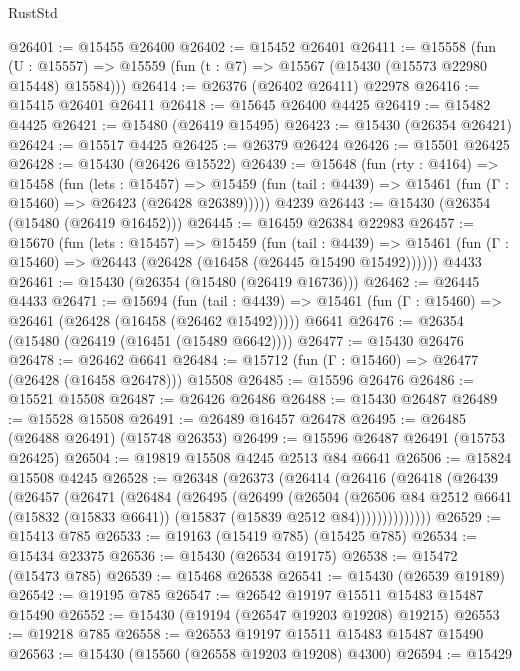 \begin{lexlean}{RustStd}
\begin{coremodule}
{\begin{coremodule}
{{{{{{{{{{{{{{{{{{{{{{{{{{{{{{{{{{{{{{{{{{{{{{{{{{{{{{{{{{{{@26401 := @15455 @26400
@26402 := @15452 @26401
@26411 := @15558
    (fun (U : @15557) => @15559 (fun (t : @7) => @15567 (@15430 (@15573 @22980 @15448) @15584)))
@26414 := @26376 (@26402 @26411) @22978
@26416 := @15415 @26401 @26411
@26418 := @15645 @26400 @4425
@26419 := @15482 @4425
@26421 := @15480 (@26419 @15495)
@26423 := @15430 (@26354 @26421)
@26424 := @15517 @4425
@26425 := @26379 @26424
@26426 := @15501 @26425
@26428 := @15430 (@26426 @15522)
@26439 := @15648
    (fun (rty : @4164) =>
    @15458
      (fun (lets : @15457) =>
      @15459 (fun (tail : @4439) => @15461 (fun (Γ : @15460) => @26423 (@26428 @26389)))))
    @4239
@26443 := @15430 (@26354 (@15480 (@26419 @16452)))
@26445 := @16459 @26384 @22983
@26457 := @15670
    (fun (lets : @15457) =>
    @15459
      (fun (tail : @4439) =>
      @15461 (fun (Γ : @15460) => @26443 (@26428 (@16458 (@26445 @15490 @15492))))))
    @4433
@26461 := @15430 (@26354 (@15480 (@26419 @16736)))
@26462 := @26445 @4433
@26471 := @15694
    (fun (tail : @4439) => @15461 (fun (Γ : @15460) => @26461 (@26428 (@16458 (@26462 @15492)))))
    @6641
@26476 := @26354 (@15480 (@26419 (@16451 (@15489 @6642))))
@26477 := @15430 @26476
@26478 := @26462 @6641
@26484 := @15712 (fun (Γ : @15460) => @26477 (@26428 (@16458 @26478))) @15508
@26485 := @15596 @26476
@26486 := @15521 @15508
@26487 := @26426 @26486
@26488 := @15430 @26487
@26489 := @15528 @15508
@26491 := @26489 @16457 @26478
@26495 := @26485 (@26488 @26491) (@15748 @26353)
@26499 := @15596 @26487 @26491 (@15753 @26425)
@26504 := @19819 @15508 @4245 @2513 @84 @6641
@26506 := @15824 @15508 @4245
@26528 := @26348
    (@26373
      (@26414
        (@26416
          (@26418
            (@26439
              (@26457
                (@26471
                  (@26484
                    (@26495
                      (@26499
                        (@26504
                          (@26506
                            @84
                            @2512
                            @6641
                            (@15832 (@15833 @6641))
                            (@15837 (@15839 @2512 @84))))))))))))))
@26529 := @15413 @785
@26533 := @19163 (@15419 @785) (@15425 @785)
@26534 := @15434 @23375
@26536 := @15430 (@26534 @19175)
@26538 := @15472 (@15473 @785)
@26539 := @15468 @26538
@26541 := @15430 (@26539 @19189)
@26542 := @19195 @785
@26547 := @26542 @19197 @15511 @15483 @15487 @15490
@26552 := @15430 (@19194 (@26547 @19203 @19208) @19215)
@26553 := @19218 @785
@26558 := @26553 @19197 @15511 @15483 @15487 @15490
@26563 := @15430 (@15560 (@26558 @19203 @19208) @4300)
@26594 := @15429
}}}}}}}}}}}}}}}}}}}}}}}}}}}}}}}}}}}}}}}}}}}}}}}}}}}}}}}}}}}}
\end{coremodule}}
\end{coremodule}
\end{lexlean}
